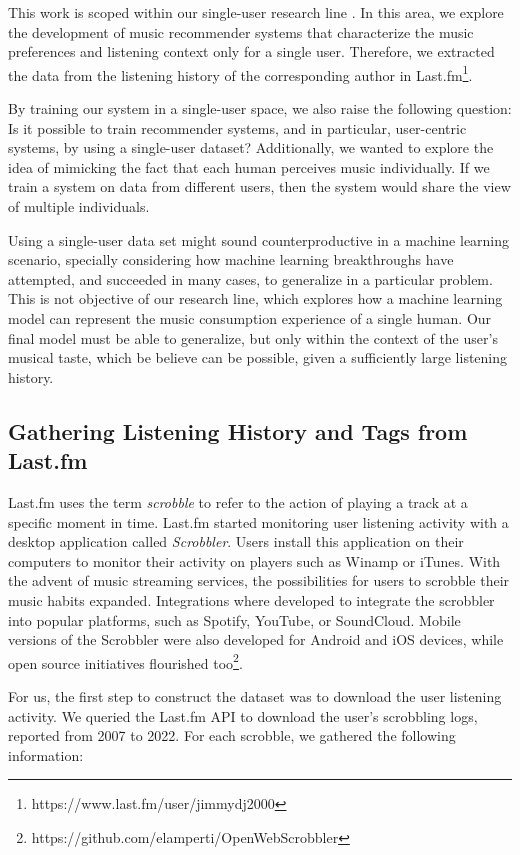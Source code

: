 \documentclass[sn-mathphys]{sn-jnl}%
\theoremstyle{thmstyleone}%
\theoremstyle{thmstyletwo}%
\theoremstyle{thmstylethree}%
\begin{document}
This work is scoped within our single-user research line \cite{ramirez2022user}.
In this area, we explore the development of music recommender systems that
characterize the music preferences and listening context only for a single user.
Therefore, we extracted the data from the
listening history of the corresponding author in Last.fm\footnote[5]{https://www.last.fm/user/jimmydj2000}.

By training our system in a single-user space, we also raise the following question: Is it possible to train
recommender systems, and in particular, user-centric systems, by using a single-user dataset?
Additionally, we wanted to explore the idea of mimicking the fact that each human perceives music individually.
If we train a system on data from different users, then the system would share the view of multiple individuals.

Using a single-user data set might sound counterproductive in a machine learning scenario, specially considering
how machine learning breakthroughs have attempted, and succeeded in many cases, to generalize in a particular problem.
This is not objective of our research line, which explores how a machine learning model can represent the music consumption experience of a single human.
Our final model must be able to generalize, but only within the context of the user's musical taste, which be believe can be possible, given a sufficiently large listening history.


\subsection{Gathering Listening History and Tags from Last.fm}

Last.fm uses the term \emph{scrobble} to refer to the action of playing a track at a specific moment in time.
Last.fm started monitoring user listening activity with a desktop application called \emph{Scrobbler}.
Users install this application on their computers to monitor their activity on players such as Winamp or iTunes.
With the advent of music streaming services, the possibilities for users to scrobble their music habits expanded.
Integrations where developed to integrate the scrobbler into popular platforms,
such as Spotify, YouTube, or SoundCloud.
Mobile versions of the Scrobbler were also developed for Android and iOS devices, while open source initiatives flourished too\footnote[6]{https://github.com/elamperti/OpenWebScrobbler}.


For us, the first step to construct the dataset was to download the user listening activity.
We queried the Last.fm API to download the user{'}s scrobbling logs, reported from 2007 to 2022.
For each scrobble, we gathered the following information:
\end{document}
